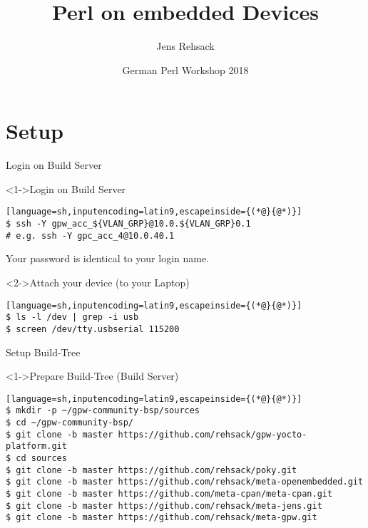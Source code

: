 \documentclass[ngerman,xcolor={table,dvipsnames},smaller,compress,hyperref={bookmarks,colorlinks},handout]{beamer}%
\title{Perl on embedded Devices}
\author{Jens Rehsack}
\institute[Niederrhein.PM]{Niederrhein Perl Mongers}
\date{German Perl Workshop 2018}
\begin{document}


\frame{\maketitle}

\part{Setup}

\begin{frame}[fragile]{Login on Build Server}
\begin{block}<1->{Login on Build Server}
\begin{lstlisting}[language=sh,inputencoding=latin9,escapeinside={(*@}{@*)}]
$ ssh -Y gpw_acc_${VLAN_GRP}@10.0.${VLAN_GRP}0.1
# e.g. ssh -Y gpc_acc_4@10.0.40.1
\end{lstlisting}
\end{block}

Your password is identical to your login name.

\begin{block}<2->{Attach your device (to your Laptop)}
\begin{lstlisting}[language=sh,inputencoding=latin9,escapeinside={(*@}{@*)}]
$ ls -l /dev | grep -i usb
$ screen /dev/tty.usbserial 115200
\end{lstlisting}
\end{block}



\end{frame}

\begin{frame}[fragile]{Setup Build-Tree}
\begin{block}<1->{Prepare Build-Tree (Build Server)}
\scriptsize
\begin{lstlisting}[language=sh,inputencoding=latin9,escapeinside={(*@}{@*)}]
$ mkdir -p ~/gpw-community-bsp/sources
$ cd ~/gpw-community-bsp/
$ git clone -b master https://github.com/rehsack/gpw-yocto-platform.git
$ cd sources
$ git clone -b master https://github.com/rehsack/poky.git
$ git clone -b master https://github.com/rehsack/meta-openembedded.git
$ git clone -b master https://github.com/meta-cpan/meta-cpan.git
$ git clone -b master https://github.com/rehsack/meta-jens.git
$ git clone -b master https://github.com/rehsack/meta-gpw.git
\end{lstlisting}
\end{block}
\end{frame}
\end{document}
